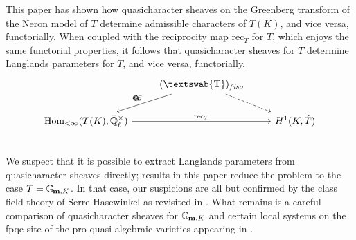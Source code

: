 \documentclass[11pt]{amsart}
\newcommand{\mathswab}[1]{\operatorname{\textswab{#1}}}
\theoremstyle{plain}
\theoremstyle{definition}
\theoremstyle{remark}
\newcommand{\EE}{\mathbb{\bar Q}_\ell}
\newcommand{\EEx}{\EE^\times}
\DeclareMathOperator{\Hom}{Hom}
\newcommand{\Gm}[1]{\mathbb{G}_{\hskip-1pt\textbf{m},#1}}
\newcommand{\GN}[1]{\mathswab{#1}}
\newcommand{\QC}{{\mathcal{Q\hskip-0.8pt C}}}
\newcommand{\QCiso}[1]{\QC(#1)_{/\textit{iso}}}
\newcommand{\trFrob}[1]{t_{#1}}
\begin{document}
This paper has shown how quasicharacter sheaves on the Greenberg transform of the Neron model of $T$ determine admissible characters of $T(K)$, and vice versa, functorially. When coupled with the reciprocity map $\text{rec}_T $ for $T$, which enjoys the same functorial properties, it follows that quasicharacter sheaves for $T$ determine Langlands parameters for $T$, and vice versa, functorially.
\[
\begin{tikzcd}
\ & \arrow[swap]{dl}{\trFrob{G}} \QCiso{\GN{T}} \arrow[dashed]{dr}  & \\
\Hom_{<\infty}(T(K),\EEx) \arrow{rr}{\text{rec}_T} && H^1(K,\hat{T}) \\
\end{tikzcd}
\]
We suspect that it is possible to extract Langlands parameters from quasicharacter sheaves directly; results in this paper reduce the problem to the case $T=\Gm{K}$. In that case, our suspicions are all but confirmed by the class field theory of Serre-Hasewinkel \cite{Serre:isogenies} as revisited in \cite{Suzuki&Yoshida:refinement}. What remains is a careful comparison of quasicharacter sheaves for $\Gm{K}$ and certain local systems on the fpqc-site of the pro-quasi-algebraic varieties appearing in \cite{Suzuki&Yoshida:refinement}. 

\end{document}
